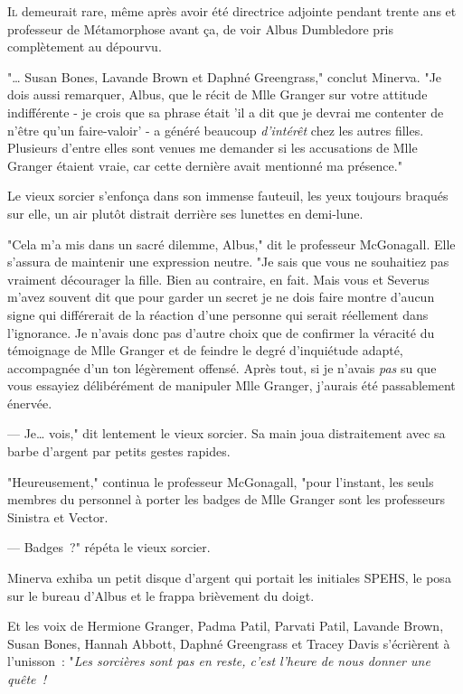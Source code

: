 
\lettrine{I}{l} demeurait rare, même après avoir été directrice adjointe pendant trente ans et professeur de Métamorphose avant ça, de voir Albus Dumbledore pris complètement au dépourvu.

"… Susan Bones, Lavande Brown et Daphné Greengrass," conclut Minerva. "Je dois aussi remarquer, Albus, que le récit de Mlle Granger sur votre attitude indifférente - je crois que sa phrase était 'il a dit que je devrai me contenter de n'être qu'un faire-valoir' - a généré beaucoup \emph{d'intérêt} chez les autres filles. Plusieurs d'entre elles sont venues me demander si les accusations de Mlle Granger étaient vraie, car cette dernière avait mentionné ma présence."

Le vieux sorcier s'enfonça dans son immense fauteuil, les yeux toujours braqués sur elle, un air plutôt distrait derrière ses lunettes en demi-lune.

"Cela m'a mis dans un sacré dilemme, Albus," dit le professeur McGonagall. Elle s'assura de maintenir une expression neutre. "Je sais que vous ne souhaitiez pas vraiment décourager la fille. Bien au contraire, en fait. Mais vous et Severus m'avez souvent dit que pour garder un secret je ne dois faire montre d'aucun signe qui différerait de la réaction d'une personne qui serait réellement dans l'ignorance. Je n'avais donc pas d'autre choix que de confirmer la véracité du témoignage de Mlle Granger et de feindre le degré d'inquiétude adapté, accompagnée d'un ton légèrement offensé. Après tout, si je n'avais \emph{pas} su que vous essayiez délibérément de manipuler Mlle Granger, j'aurais été passablement énervée.

--- Je… vois," dit lentement le vieux sorcier. Sa main joua distraitement avec sa barbe d'argent par petits gestes rapides.

"Heureusement," continua le professeur McGonagall, "pour l'instant, les seuls membres du personnel à porter les badges de Mlle Granger sont les professeurs Sinistra et Vector.

--- Badges~?" répéta le vieux sorcier.

Minerva exhiba un petit disque d'argent qui portait les initiales SPEHS, le posa sur le bureau d'Albus et le frappa brièvement du doigt.

Et les voix de Hermione Granger, Padma Patil, Parvati Patil, Lavande Brown, Susan Bones, Hannah Abbott, Daphné Greengrass et Tracey Davis s'écrièrent à l'unisson~: "\emph{Les sorcières sont pas en reste, c'est l'heure de nous donner une quête~!}

